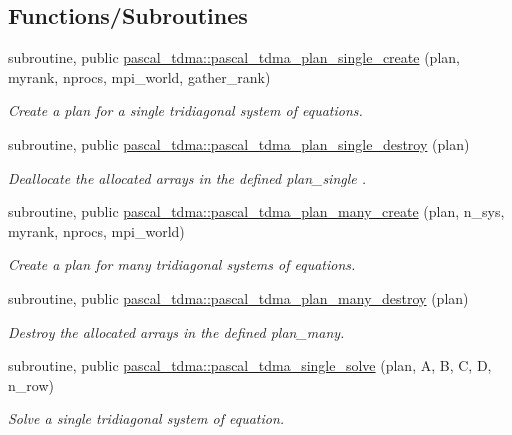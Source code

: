\subsection*{Functions/\+Subroutines}
\begin{DoxyCompactItemize}
\item 
subroutine, public \mbox{\hyperlink{namespacepascal__tdma_a5dfc2d7c919b47ad364a74d141532a9f}{pascal\+\_\+tdma\+::pascal\+\_\+tdma\+\_\+plan\+\_\+single\+\_\+create}} (plan, myrank, nprocs, mpi\+\_\+world, gather\+\_\+rank)
\begin{DoxyCompactList}\small\item\em Create a plan for a single tridiagonal system of equations. \end{DoxyCompactList}\item 
subroutine, public \mbox{\hyperlink{namespacepascal__tdma_adb04e59c740ce6c4b9518dd86eaeb594}{pascal\+\_\+tdma\+::pascal\+\_\+tdma\+\_\+plan\+\_\+single\+\_\+destroy}} (plan)
\begin{DoxyCompactList}\small\item\em Deallocate the allocated arrays in the defined plan\+\_\+single . \end{DoxyCompactList}\item 
subroutine, public \mbox{\hyperlink{namespacepascal__tdma_a7e9c24b343ae949044eccc8692dcc6e9}{pascal\+\_\+tdma\+::pascal\+\_\+tdma\+\_\+plan\+\_\+many\+\_\+create}} (plan, n\+\_\+sys, myrank, nprocs, mpi\+\_\+world)
\begin{DoxyCompactList}\small\item\em Create a plan for many tridiagonal systems of equations. \end{DoxyCompactList}\item 
subroutine, public \mbox{\hyperlink{namespacepascal__tdma_a8438e6774617871b147af9ec8bdad6ce}{pascal\+\_\+tdma\+::pascal\+\_\+tdma\+\_\+plan\+\_\+many\+\_\+destroy}} (plan)
\begin{DoxyCompactList}\small\item\em Destroy the allocated arrays in the defined plan\+\_\+many. \end{DoxyCompactList}\item 
subroutine, public \mbox{\hyperlink{namespacepascal__tdma_ab14e132231d4b53fd65dd333ccc85a50}{pascal\+\_\+tdma\+::pascal\+\_\+tdma\+\_\+single\+\_\+solve}} (plan, A, B, C, D, n\+\_\+row)
\begin{DoxyCompactList}\small\item\em Solve a single tridiagonal system of equation. \end{DoxyCompactList}\item 

\end{DoxyCompactItemize}
